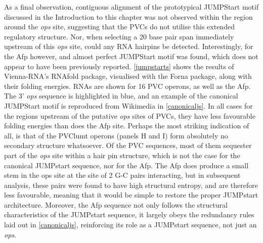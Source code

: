 As a final observation, contiguous alignment of the prototypical JUMPStart motif discussed in the Introduction to this chapter was not observed within the region around the \emph{ops} site, suggesting that the PVCs do not utilise this extended regulatory structure.
Nor, when selecting a 20 base pair span immediately upstream of this \emph{ops} site, could any RNA hairpins be detected. Interestingly, for the Afp however, and almost perfect JUMPStart motif was found, which does not appear to have been previously reported. \vref{jumpstarts} shows the results of Vienna-RNA's RNAfold package, visualised with the Forna package, along with their folding energies. RNAs are shown for 16 PVC operons, as well as the Afp. The 3' \emph{ops} sequence is highlighted in blue, and an example of the canonical JUMPStart motif is reproduced from Wikimedia in \vref{canonicaljs}. In all cases for the regions upstream of the putative \emph{ops} sites of PVCs, they have less favourable folding energies than does the Afp site. Perhaps the most striking indication of all, is that of the PVClumt operons (panels H and I) form absolutely no secondary structure whatsoever. Of the PVC sequences, most of them sequester part of the \emph{ops} site within a hair pin structure, which is not the case for the canonical JUMPstart sequence, nor for the Afp. The Afp does produce a small stem in the ops site at the site of 2 G-C pairs interacting, but in subsequent analysis, these pairs were found to have high structural entropy, and are therefore less favourable, meaning that it would be simple to restore the proper JUMPstart architecture. Moreover, the Afp sequence not only follows the structural characteristics of the JUMPstart sequence, it largely obeys the redundancy rules laid out in \vref{canonicaljs}, reinforcing its role as a JUMPstart sequence, not just an \emph{ops}.

